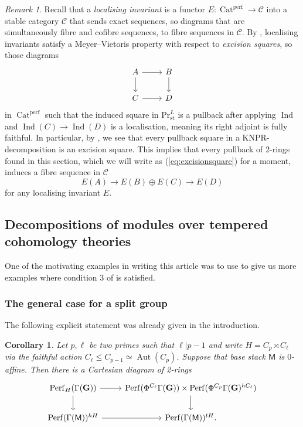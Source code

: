 \documentclass[11pt, a4paper]{article}
\newcommand{\perf}{\mathrm{perf}}
\newcommand{\st}{\mathrm{st}}
\newcommand{\1}{\mathbf{1}}
\DeclareMathOperator{\Cat}{Cat}
\newcommand{\PrLst}{{\mathrm{Pr}^L_\st}}
\DeclareMathOperator{\Ind}{Ind}
\DeclareMathOperator{\Perf}{Perf}
\DeclareMathOperator{\Aut}{Aut}
\newcommand{\calC}{\mathcal{C}}
\newcommand{\G}{\mathbf{G}}
\newcommand{\M}{\mathsf{M}}
\newcommand{\Ga}{\Gamma}
\theoremstyle{plain}
\newtheorem{cor}[equation]{Corollary}
\theoremstyle{definition}
\theoremstyle{remark}\numberwithin{equation}{section}
\newtheorem{remark}[equation]{Remark}
\begin{document}
\begin{remark}\label{rmk:localising_invariants}
Recall that a \emph{localising invariant} is a functor $E\colon \Cat^\perf \to \calC$ into a stable category $\calC$ that sends exact sequences, so diagrams that are simultaneously fibre and cofibre sequences, to fibre sequences in $\calC$. By \cite[Thm.18]{tamme_excision}, localising invariants satisfy a Meyer--Vietoris property with respect to \emph{excision squares}, so those diagrams
\begin{equation}\label{eq:excisionsquare}\begin{tikzcd}
    {A}\ar[r]\ar[d] &   {B}\ar[d]   \\
    {C}\ar[r]       &   {D}
\end{tikzcd}\end{equation}
in $\Cat^\perf$ such that the induced square in $\PrLst$ is a pullback after applying $\Ind$ and $\Ind(C) \to \Ind(D)$ is a localisation, meaning its right adjoint is fully faithful. In particular, by , we see that every pullback square in a KNPR-decomposition is an excision square. This implies that every pullback of 2-rings found in this section, which we will write as (\ref{eq:excisionsquare}) for a moment, induces a fibre sequence in $\calC$
\[E(A) \to E(B) \oplus E(C) \to E(D)\]
for any localising invariant $E$.
\end{remark}

\subsection{Decompositions of modules over tempered cohomology theories}\label{ssec:general_decompositions}
One of the motivating examples in writing this article was to use  to give us more examples where condition 3 of  is satisfied. 

\subsubsection{The general case for a split group}
The following explicit statement was already given in the introduction.

\begin{cor}\label{pr:categorical_decomposition}
    Let $p,\ell$ be two primes such that $\ell| p-1$ and write $H=C_p \rtimes C_\ell$ via the faithful action $C_\ell \leq C_{p-1} \simeq \Aut(C_p)$. Suppose that base stack $\M$ is $0$-affine. Then there is a Cartesian diagram of 2-rings
    \[\begin{tikzcd}
    {\Perf_{H}(\Ga(\G))}\ar[r]\ar[d]    &   {\Perf(\Phi^{C_\ell}\Ga(\G)) \times \Perf(\Phi^{C_p}\Ga(\G)^{hC_\ell})}\ar[d]  \\
    {\Perf(\Ga(\M))^{hH}}\ar[r] &   {\Perf(\Ga(\M))^{tH}.}
\end{tikzcd}\]
\end{cor}
\end{document}
